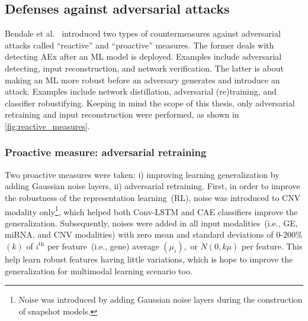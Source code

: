\subsection{Defenses against adversarial attacks}
Bendale et al.~\cite{OOD19} introduced two types of countermeasures against adversarial attacks called ``reactive'' and ``proactive'' measures. The former deals with detecting AEx after an ML model is deployed. Examples include adversarial detecting, input reconstruction, and network verification. The latter is about making an ML more robust before an adversary generates and introduce an attack. Examples include network distillation, adversarial (re)training, and classifier robustifying. Keeping in mind the scope of this thesis, only adversarial retraining and input reconstruction were performed, as shown in \cref{fig:reactive_measures}. 

\subsubsection{Proactive measure: adversarial retraining}
Two proactive measures were taken: i) improving learning generalization by adding Gaussian noise layers, ii) adversarial retraining. 
First, in order to improve the robustness of the representation learning~(RL), noise was introduced to CNV modality only\footnote{Noise was introduced by adding Gaussian noise layers during the construction of snapshot models.}, which helped both Conv-LSTM and CAE classifiers improve the generalization. Subsequently, noises were added in all input modalities~(i.e., GE, miRNA, and CNV modalities) with zero mean and standard deviations of 0-200\% $(k)$ of $i^{\text {th}}$ per feature~(i.e., gene) average $\left(\mu_{i}\right),$ or $N(0, k \mu)$ per feature. This help learn robust features having little variations, which is hope to improve the generalization for multimodal learning scenario too. 

